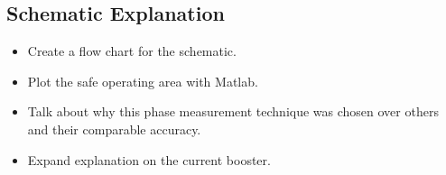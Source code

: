 \subsection{Schematic Explanation}
\begin{itemize}
    \item Create a flow chart for the schematic.
    \item Plot the safe operating area with Matlab.
    \item Talk about why this phase measurement technique was chosen over others and their comparable accuracy.
    \item Expand explanation on the current booster.
\end{itemize}

